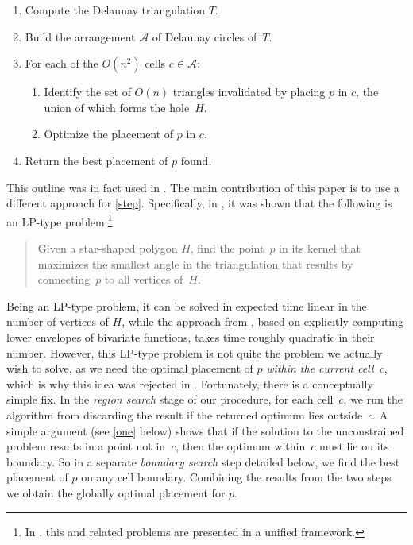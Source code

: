 \documentclass{cccg13}
\newcommand\arr{\mathcal A}
\begin{document}
\begin{enumerate}
\item Compute the Delaunay triangulation $T$.
\item Build the arrangement $\arr$ of Delaunay circles of~$T$.
\item For each of the $O(n^2)$ cells $c \in \arr$:
  \begin{enumerate}
  \item Identify the set of $O(n)$ triangles invalidated by placing $p$ in $c$, the union of which
  	forms the hole~$H$.
  \item Optimize the placement of $p$ in $c$. \label{step}
  \end{enumerate}
\item Return the best placement of $p$ found.
\end{enumerate}
This outline was in fact used in \cite{orig}.  The main contribution of this paper is to use a different approach for \autoref{step}.  Specifically, in \cite{lp}, it was shown that the following is an LP-type problem.\footnote{In \cite{quasi-convex}, this and related problems are presented in a unified framework.}
\begin{quote}
Given a star-shaped polygon $H$, find the point~$p$ in its kernel that maximizes the smallest angle in the triangulation that results by connecting~$p$ to all vertices of~$H$.
\end{quote}
Being an LP-type problem, it can be solved in expected time linear in the number of vertices of $H$, while the approach from \cite{orig}, based on explicitly computing lower envelopes of bivariate functions, takes time roughly quadratic in their number.  However, this LP-type problem is not quite the problem we actually wish to solve, as we need the optimal placement of $p$ \emph{within the current cell~$c$}, which is why this idea was rejected in \cite{orig}.  Fortunately, there is a conceptually simple fix.  In the \emph{region search} stage of our procedure, for each cell~$c$, we run the algorithm from \cite{lp} discarding the result if the returned optimum lies outside~$c$.  A simple argument (see \autoref{one} below) shows that if the solution to the unconstrained problem results in a point not in~$c$, then the optimum within~$c$ must lie on its boundary.  So in a separate \emph{boundary search} step detailed below, we find the best placement of $p$ on any cell boundary.  Combining the results from the two steps we obtain the globally optimal placement for $p$.
\end{document}
